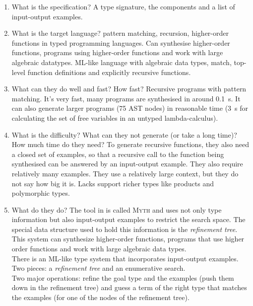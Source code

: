 \begin{itemize}
\begin{enumerate}
\item What is the specification?
A type signature, the components and a list of input-output examples.
\item What is the target language?
pattern matching, recursion, higher-order functions in typed programming languages. Can synthesise higher-order functions, programs using higher-order functions and work with large algebraic datatypes.
ML-like language with algebraic data types, match, top-level function definitions and explicitly recursive functions.
\item What can they do well and fast? How fast?
Recursive programs with pattern matching. It's very fast, many programs are synthesised in around 0.1~s. It can also generate larger programs (75 AST nodes) in reasonable time (3~s for calculating the set of free variables in an untyped lambda-calculus).
\item What is the difficulty? What can they not generate (or take a long time)? How much time do they need?
To generate recursive functions, they also need a closed set of examples, so that a recursive call to the function being synthesised can be answered by an input-output example. They also require relatively many examples. They use a relatively large context, but they do not say how big it is.
Lacks support richer types like products and polymorphic types.
\item What do they do?
The tool in \cite{MythPaper} is called \textsc{Myth} and uses not only type information but also input-output examples to restrict the search space. The special data structure used to hold this information is the \emph{refinement tree}. This system can synthesize higher-order functions, programs that use higher order functions and work with large algebraic data types.\\
There is an ML-like type system that incorporates input-output examples. Two pieces: a \emph{refinement tree} and an enumerative search.\\
Two major operations: refine the goal type and the examples (push them down in the refinement tree) and guess a term of the right type that matches the examples (for one of the nodes of the refinement tree).\\
\end{enumerate}


\end{itemize}






